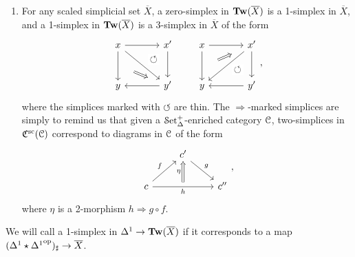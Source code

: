 \documentclass[main.tex]{subfiles}
\begin{document}
\begin{enumerate}
  \item For any scaled simplicial set $\overline{X}$, a zero-simplex in $\mathbf{Tw}(\overline{X})$ is a 1-simplex in $\overline{X}$, and a 1-simplex in $\mathbf{Tw}(\overline{X})$ is a 3-simplex in $\overline{X}$ of the form
    \begin{equation*}
      \begin{tikzcd}[column sep=large, row sep=large]
        x
        \arrow[r]
        \arrow[d, ""{name=L, right}]
        \arrow[dr]
        & x'
        \arrow[d, ""{name=R, left}]
        \arrow[from=l, to=R, phantom, near end, "\circlearrowleft"{description}]
        \\
        y
        & y'
        \arrow[l]
        \arrow[from=L, Rightarrow, shorten=3ex]
      \end{tikzcd}
      \qquad
      \begin{tikzcd}[column sep=large, row sep=large]
        x
        \arrow[r]
        \arrow[d, ""{name=L, right}]
        & x'
        \arrow[d, ""{name=R, left}]
        \arrow[dl]
        \\
        y
        \arrow[from=R, phantom, near start, "\circlearrowleft"{description}]
        & y'
        \arrow[l]
        \arrow[from=L, to=u, shorten=3ex, Rightarrow]
      \end{tikzcd},
    \end{equation*}
    where the simplices marked with $\circlearrowleft$ are thin. The $\Rightarrow$-marked simplices are simply to remind us that given a $\mathcal{S}\mathrm{et}_{\Delta}^{+}$-enriched category $\mathcal{C}$, two-simplices in $\mathfrak{C}^{\mathrm{sc}}(\mathcal{C})$ correspond to diagrams in $\mathcal{C}$ of the form
    \begin{equation*}
      \begin{tikzcd}
        & c'
        \arrow[dr, "g"]
        \\
        c
        \arrow[ur, "f"]
        \arrow[rr, "h"{below}, ""{name=B, above}]
        && c''
        \arrow[from=B, to=ul, Rightarrow, "\eta"]
      \end{tikzcd},
    \end{equation*}
    where $\eta$ is a 2-morphism $h \Rightarrow g \circ f$.
\end{enumerate}

\begin{definition}
  We will call a 1-simplex in $\Delta^{1} \to \mathbf{Tw}(\overline{X})$  if it corresponds to a map $(\Delta^{1} \star {\Delta^{1}}^{\mathrm{op}})_{\sharp} \to \overline{X}$.
\end{definition}
\end{document}
